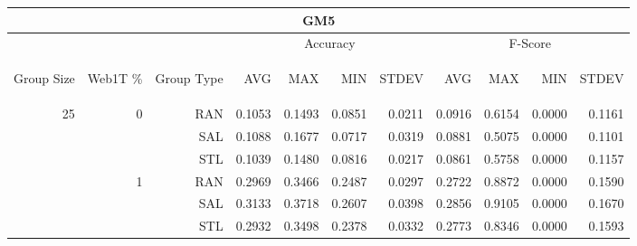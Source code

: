 \begin{center}
\begin{table}[htbp]
\begin{tabular}{ | r | r | r | r | r | r | r | r | r | r | r |}
\hline
\multicolumn{11}{|c|}{GM5}\\
\hline
 & & & \multicolumn{4}{|c|}{Accuracy} & \multicolumn{4}{|c|}{F-Score}\\ \cline{4-11}
\begin{sideways}Group Size\end{sideways} & \begin{sideways}Web1T \%\end{sideways} & \begin{sideways}Group Type\end{sideways} & \begin{sideways}AVG\end{sideways} & \begin{sideways}MAX\end{sideways} & \begin{sideways}MIN\end{sideways} & \begin{sideways}STDEV\end{sideways} & \begin{sideways}AVG\end{sideways} & \begin{sideways}MAX\end{sideways} & \begin{sideways}MIN\end{sideways} & \begin{sideways}STDEV\end{sideways}\\
\hline
\multirow{12}{*}{25}
 & \multirow{3}{*}{0} & RAN & 0.1053 & 0.1493 & 0.0851 & 0.0211 & 0.0916 & 0.6154 & 0.0000 & 0.1161\\ \cline{3-11}
 &   & SAL & 0.1088 & 0.1677 & 0.0717 & 0.0319 & 0.0881 & 0.5075 & 0.0000 & 0.1101\\ \cline{3-11}
 &   & STL & 0.1039 & 0.1480 & 0.0816 & 0.0217 & 0.0861 & 0.5758 & 0.0000 & 0.1157\\ \cline{2-11}
 & \multirow{3}{*}{1} & RAN & 0.2969 & 0.3466 & 0.2487 & 0.0297 & 0.2722 & 0.8872 & 0.0000 & 0.1590\\ \cline{3-11}
 &   & SAL & 0.3133 & 0.3718 & 0.2607 & 0.0398 & 0.2856 & 0.9105 & 0.0000 & 0.1670\\ \cline{3-11}
 &   & STL & 0.2932 & 0.3498 & 0.2378 & 0.0332 & 0.2773 & 0.8346 & 0.0000 & 0.1593\\ \cline{2-11}

\end{tabular}
\end{table}
\end{center}
